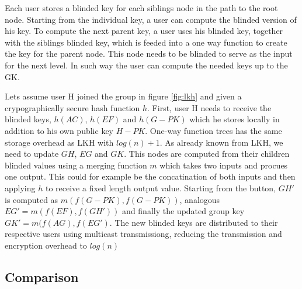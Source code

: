Each user stores a blinded key for each siblings node in the path to the root node. Starting from the individual key, a user can compute the blinded version of his key. To compute the next parent key, a user uses his blinded key, together with the siblings blinded key, which is feeded into a one way function to create the key for the parent node. This node needs to be blinded to serve as the input for the next level. In such way the user can compute the needed keys up to the GK. 

Lets assume user H joined the group in figure \ref{fig:lkh} and given a crypographically secure hash function $h$. First, user H needs to receive the blinded keys, $h(AC)$, $h(EF)$ and $h(G-PK)$ which he stores locally in addition to his own public key $H-PK$. One-way function trees has the same storage overhead as LKH with $log(n) + 1$.  As already known from LKH, we need to update $GH$, $EG$ and $GK$. This nodes are computed from their children blinded values using a merging function $m$ which takes two inputs and procues one output. This could for example be the concatination of both inputs and then applying $h$ to receive a fixed length output value. Starting from the button,  $GH'$ is computed as $m(f(G-PK), f(G-PK))$, analogous $EG' = m(f(EF), f(GH'))$ and finally the updated group key $GK' = m(f(AG), f(EG')$. The new blinded keys are distributed to their respective users using multicast transmissiong, reducing the transmission and encryption overhead to $log(n)$


\subsection{Comparison}

